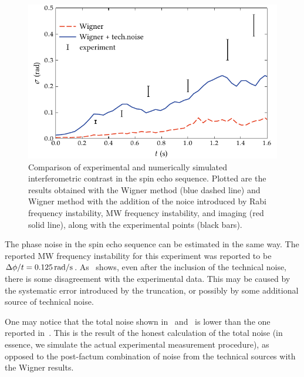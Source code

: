 \begin{figure}
    \centerline{\includegraphics{figures_generated/bec_noise/echo_noise.pdf}}

    \caption{Comparison of experimental and numerically simulated interferometric contrast in the spin echo sequence.
    Plotted are the results obtained with the Wigner method (blue dashed line) and Wigner method with the addition of the noice introduced by Rabi frequency instability, MW frequency instability, and imaging (red solid line), along with the experimental points (black bars).}

    \label{fig:bec-noise:phase-noise:echo-phnoise}
\end{figure}

The phase noise in the spin echo sequence can be estimated in the same way.
The reported MW frequency instability for this experiment was reported to be $\Delta \phi / t = 0.125\mbox{\ensuremath{\,\mathrm{rad/s}}}$.
As~ shows, even after the inclusion of the technical noise, there is some disagreement with the experimental data.
This may be caused by the systematic error introduced by the truncation, or possibly by some additional source of technical noise.

One may notice that the total noise shown in~ and~ is lower than the one reported in~\cite{Egorov2011,Egorov2012}.
This is the result of the honest calculation of the total noise (in essence, we simulate the actual experimental measurement procedure), as opposed to the post-factum combination of noise from the technical sources with the Wigner results.

